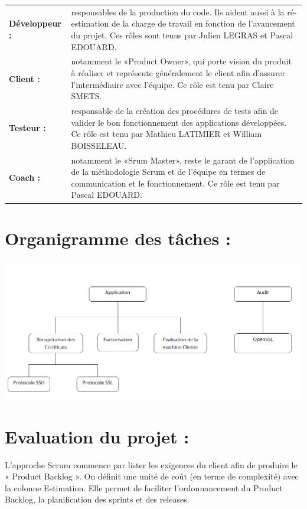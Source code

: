 \documentclass[a4paper,11pt,french]{article}
\begin{document}
\begin{tabular}{l p{15cm}}
\textbf{Développeur :} & responsables de la production du code. Ils aident aussi à la ré-estimation de la charge de travail en fonction de l'avancement du projet. Ces rôles sont tenus par Julien LEGRAS et Pascal EDOUARD. \\
\textbf{Client :}& notamment le «Product Owner», qui porte vision du produit à réaliser et représente généralement le client afin d'assurer l'intermédiaire avec l'équipe. Ce rôle est tenu par Claire SMETS.\\
\textbf{Testeur :}&  responsable de la création des procédures de tests afin de valider le bon fonctionnement des applications développées. Ce rôle est tenu par Mathieu LATIMIER et William BOISSELEAU.\\
\textbf{Coach :}&  notamment le «Srum Master», reste le garant de l'application de la méthodologie Scrum et de l'équipe en termes de communication et le fonctionnement. Ce rôle est tenu par Pascal EDOUARD.
\end{tabular}

\newpage

\section{Organigramme des tâches :}
\includegraphics[width=45em]{organigramme.png}

\section{Evaluation du projet :}

L'approche Scrum commence par lister les exigences du client afin de produire le « Product Backlog ». On définit une unité de coût (en terme de complexité) avec la colonne Estimation. Elle permet de faciliter l'ordonnancement du Product Backlog, la planification des sprints et des releases.
\end{document}
